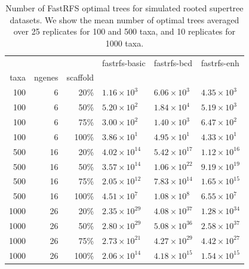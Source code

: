 \begin{table}
\centering
\begin{tabular}{|rrr|lll|}
 
\hline
 & & & fastrfs-basic & fastrfs-bcd & fastrfs-enh\\
taxa&ngenes&scaffold&&&\\


\hline 
\hline
100&6&20\%	&$1.16\times 10^{3}$	&$6.06\times 10^{3}$	&$4.35\times 10^{3}$\\
100&6&50\%	&$5.20\times 10^{2}$	&$1.84\times 10^{4}$	&$5.19\times 10^{3}$\\
100&6&75\%	&$3.00\times 10^{2}$	&$1.40\times 10^{3}$	&$6.47\times 10^{2}$\\
100&6&100\%	&$3.86\times 10^{1}$	&$4.95\times 10^{1}$	&$4.33\times 10^{1}$\\
\hline
500&16&20\%	&$4.02\times 10^{14}$	&$5.42\times 10^{17}$	&$1.12\times 10^{16}$\\
500&16&50\%	&$3.57\times 10^{14}$	&$1.06\times 10^{22}$	&$9.19\times 10^{19}$\\
500&16&75\%	&$2.05\times 10^{12}$	&$7.83\times 10^{14}$	&$1.65\times 10^{15}$\\
500&16&100\%	&$4.51\times 10^{7}$	&$1.08\times 10^{8}$	&$6.55\times 10^{7}$\\
\hline
1000&26&20\%	&$2.35\times 10^{29}$	&$4.08\times 10^{37}$	&$1.28\times 10^{34}$\\
1000&26&50\%	&$2.80\times 10^{29}$	&$5.08\times 10^{36}$	&$2.58\times 10^{37}$\\
1000&26&75\%	&$2.73\times 10^{21}$	&$4.27\times 10^{29}$	&$4.42\times 10^{27}$\\
1000&26&100\%	&$2.06\times 10^{14}$	&$4.18\times 10^{15}$	&$1.54\times 10^{15}$\\
\hline
\end{tabular}


\caption[Number of FastRFS optimal trees for simulated
  rooted supertree datasets.]{Number of FastRFS optimal trees for simulated
  rooted supertree datasets. We show the mean number
  of optimal trees averaged over 25 replicates for 100 and 500 taxa,
  and 10 replicates for 1000 taxa.} \label{supertree_rooted_counts}
\end{table}







 
